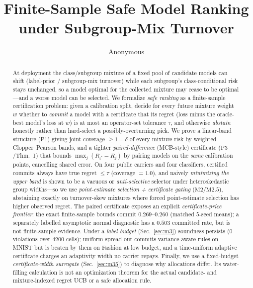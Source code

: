 \documentclass{article}
\title{Finite-Sample Safe Model Ranking under Subgroup-Mix Turnover}
\author{Anonymous}
\date{}
\begin{document}
\maketitle

\begin{abstract}
At deployment the class/subgroup mixture of a fixed pool of candidate models can shift
(label-prior / subgroup-mix turnover) while each subgroup's class-conditional risk stays
unchanged, so a model optimal for the collected mixture may cease to be optimal---and a
worse model can be selected. We formalize \emph{safe ranking} as a finite-sample
certification problem: given a calibration split, decide for every future mixture weight $w$
whether to \emph{commit} a model with a certificate that its regret (loss minus the
oracle-best model's loss at $w$) is at most an operator-set tolerance $\tau$, and otherwise
\emph{abstain} honestly rather than hard-select a possibly-overturning pick. We prove a
linear-band structure ($\mathrm{P1}$) giving joint coverage $\ge1-\delta$ of every mixture
risk by weighted Clopper--Pearson bands, and a tighter \emph{paired-difference} (MCB-style)
certificate ($\mathrm{P3}$/Thm.~1) that bounds $\max_j(R_{i^*}-R_j)$ by pairing models on the
\emph{same} calibration points, cancelling shared error. On four public carriers and four
classifiers, certified commits always have true regret $\le\tau$ (coverage $=1.0$), and
naively \emph{minimizing the upper band} is shown to be a vacuous or \emph{anti-selective}
selector under heteroskedastic group widths---so we use \emph{point-estimate selection +
certificate gating} ($\mathrm{M2}$/$\mathrm{M2.5}$), abstaining exactly on turnover-skew
mixtures where forced point-estimate selection has higher observed regret. The paired certificate
exposes an explicit \emph{certificate-price frontier}: the exact finite-sample bounds commit
$0.269$--$0.260$ (matched $5$-seed means); a separately labelled asymptotic normal diagnostic
has a $0.503$ committed rate, but is not finite-sample evidence.
Under a \emph{label budget} (Sec.~\ref{sec:m3}) soundness persists (0 violations over 4200
cells); uniform spread out-commits variance-aware rules on MNIST but is beaten by them on
Fashion at low budget, and a time-uniform adaptive certificate charges an adaptivity width no
carrier repays. Finally, we use a fixed-budget \emph{certificate-width surrogate}
(Sec.~\ref{sec:m35}) to diagnose why allocations differ. Its water-filling calculation is not
an optimization theorem for the actual candidate- and mixture-indexed regret UCB or a safe
allocation rule.
\end{abstract}
\end{document}

